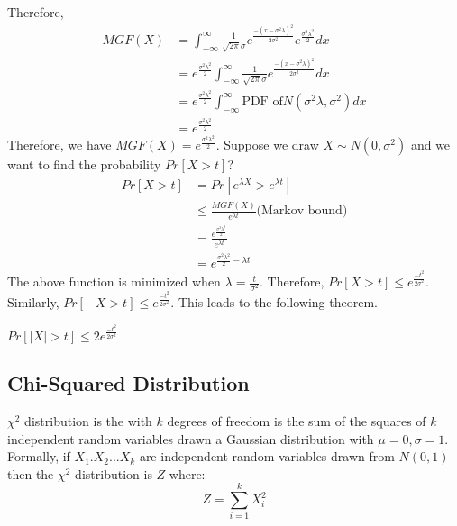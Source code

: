 \documentclass[11pt]{article}
\begin{document}
Therefore,
\begin{equation}
\begin{split}
MGF(X) &= \int_{-\infty}^{\infty} \frac{1}{\sqrt{2\pi}\sigma} e^{\frac{-(x-\sigma^2\lambda)^2}{2\sigma^2}} e^{\frac{\sigma^2\lambda^2}{2}} dx \\
&= e^{\frac{\sigma^2\lambda^2}{2}} \int_{-\infty}^{\infty} \frac{1}{\sqrt{2\pi}\sigma} e^{\frac{-(x-\sigma^2\lambda)^2}{2\sigma^2}} dx\\
&= e^{\frac{\sigma^2\lambda^2}{2}} \int_{-\infty}^{\infty} \text{PDF of} N(\sigma^2\lambda, \sigma^2) dx\\
&= e^{\frac{\sigma^2\lambda^2}{2}}
\end{split}
\end{equation}
Therefore, we have $MGF(X) = e^{\frac{\sigma^2\lambda^2}{2}}$. Suppose we draw $X\sim N(0, \sigma^2)$ and we want to find the probability $Pr[X>t]$?
\begin{equation}
\begin{split}
Pr[X>t] &= Pr[e^{\lambda X}>e^{\lambda t}] \\
&\leq \frac{MGF(X)}{e^{\lambda t}} \text{(Markov bound)} \\
&= \frac{e^{\frac{\sigma^2\lambda^2}{2}}}{e^{\lambda t}} \\
&= e^{\frac{\sigma^2\lambda^2}{2} - \lambda t}
\end{split}
\end{equation}
The above function is minimized when $\lambda=\frac{t}{\sigma^2}$. Therefore, $Pr[X>t]\leq e^{\frac{-t^2}{2\sigma^2}}$. Similarly, $Pr[-X>t]\leq e^{\frac{-t^2}{2\sigma^2}}$. This leads to the following theorem.

\begin{theorem}
$Pr[|X|>t]\leq 2e^{\frac{-t^2}{2\sigma^2}}$
\end{theorem}

\subsection{Chi-Squared Distribution}
$\chi^2$ distribution is the with $k$ degrees of freedom is the sum of the squares of $k$ independent random variables drawn a Gaussian distribution with $\mu=0, \sigma=1$. Formally, if $X_1. X_2...X_k$ are independent random variables drawn from $N(0,1)$ then the $\chi^2$ distribution is $Z$ where:
\begin{equation}
Z=\sum_{i=1}^{k} X_i^2
\end{equation}
\end{document}
